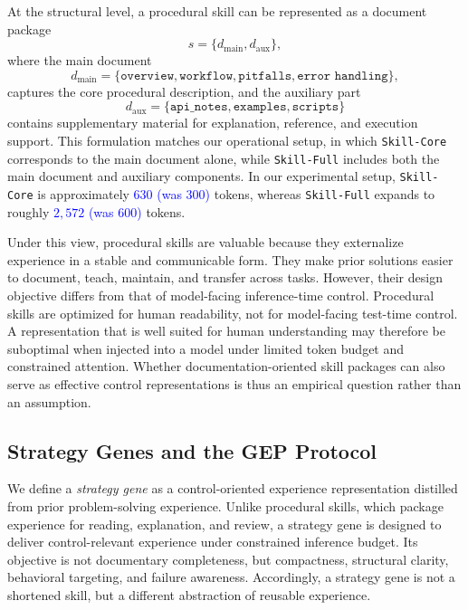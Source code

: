 \documentclass{article}
\newcommand{\blue}[1]{\textcolor{blue}{#1}}
\begin{document}
At the structural level, a procedural skill can be represented as a document package
\begin{equation}
s = \{d_{\text{main}}, d_{\text{aux}}\},
\end{equation}
where the main document
\begin{equation}
d_{\text{main}} = \{\texttt{overview}, \texttt{workflow}, \texttt{pitfalls}, \texttt{error\ handling}\},
\end{equation}
captures the core procedural description, and the auxiliary part
\begin{equation}
d_{\text{aux}} = \{\texttt{api\_notes}, \texttt{examples}, \texttt{scripts}\}
\end{equation}
contains supplementary material for explanation, reference, and execution support. 
This formulation matches our operational setup, in which \texttt{Skill-Core} corresponds to the main document alone, while \texttt{Skill-Full} includes both the main document and auxiliary components. 
In our experimental setup, \texttt{Skill-Core} is approximately \blue{$630$ (was $300$)} tokens, whereas \texttt{Skill-Full} expands to roughly \blue{$2{,}572$ (was $600$)} tokens.

Under this view, procedural skills are valuable because they externalize experience in a stable and communicable form. 
They make prior solutions easier to document, teach, maintain, and transfer across tasks. 
However, their design objective differs from that of model-facing inference-time control. 
Procedural skills are optimized for human readability, not for model-facing test-time control. 
A representation that is well suited for human understanding may therefore be suboptimal when injected into a model under limited token budget and constrained attention. 
Whether documentation-oriented skill packages can also serve as effective control representations is thus an empirical question rather than an assumption.

\subsection{Strategy Genes and the GEP Protocol}
\label{sec:genes}

We define a \emph{strategy gene} as a control-oriented experience representation distilled from prior problem-solving experience. 
Unlike procedural skills, which package experience for reading, explanation, and review, a strategy gene is designed to deliver control-relevant experience under constrained inference budget. 
Its objective is not documentary completeness, but compactness, structural clarity, behavioral targeting, and failure awareness. 
Accordingly, a strategy gene is not a shortened skill, but a different abstraction of reusable experience.
\end{document}

